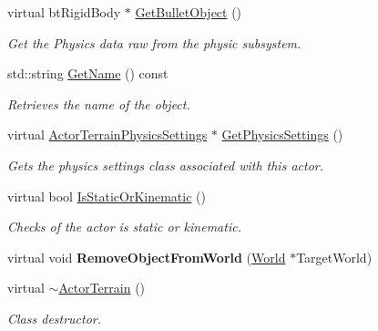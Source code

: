 \begin{DoxyCompactItemize}
\item 
virtual btRigidBody $\ast$ \hyperlink{classMezzanine_1_1ActorTerrain_aea5093ccb329184502c0ac36d372683c}{GetBulletObject} ()
\begin{DoxyCompactList}\small\item\em Get the Physics data raw from the physic subsystem. \item\end{DoxyCompactList}\item 
std::string \hyperlink{classMezzanine_1_1ActorTerrain_a072164c245d3ed761558f18e9106416a}{GetName} () const 
\begin{DoxyCompactList}\small\item\em Retrieves the name of the object. \item\end{DoxyCompactList}\item 
virtual \hyperlink{classMezzanine_1_1ActorTerrainPhysicsSettings}{ActorTerrainPhysicsSettings} $\ast$ \hyperlink{classMezzanine_1_1ActorTerrain_a95e30dc1ab3daddc46357b3c421b644f}{GetPhysicsSettings} ()
\begin{DoxyCompactList}\small\item\em Gets the physics settings class associated with this actor. \item\end{DoxyCompactList}\item 
virtual bool \hyperlink{classMezzanine_1_1ActorTerrain_a73d23a9ab0f0eb2fd3238edbd226bd8a}{IsStaticOrKinematic} ()
\begin{DoxyCompactList}\small\item\em Checks of the actor is static or kinematic. \item\end{DoxyCompactList}\item 
\hypertarget{classMezzanine_1_1ActorTerrain_a40396ea4921f3a911a5cedae001efc1b}{
virtual void {\bfseries RemoveObjectFromWorld} (\hyperlink{classMezzanine_1_1World}{World} $\ast$TargetWorld)}
\label{classMezzanine_1_1ActorTerrain_a40396ea4921f3a911a5cedae001efc1b}

\item 
virtual \hyperlink{classMezzanine_1_1ActorTerrain_a602d36036eebb45501aabade1e1ec3e9}{$\sim$ActorTerrain} ()
\begin{DoxyCompactList}\small\item\em Class destructor. \item\end{DoxyCompactList}\end{DoxyCompactItemize}
